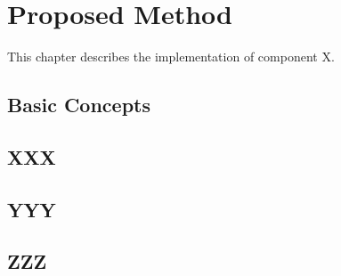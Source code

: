 
%

\chapter{Proposed Method\label{cha:chapter3}}

This chapter describes the implementation of component X.

\section{Basic Concepts\label{sec:ch3basic}}

\section{XXX\label{sec:ch3xxx}}

\section{YYY\label{sec:ch3yyy}}

\section{ZZZ\label{sec:ch3zzz}}
